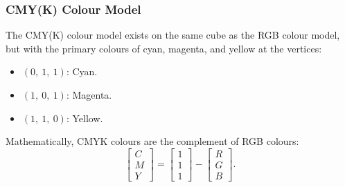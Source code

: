 \documentclass{article}
\begin{document}
\subsubsection{CMY(K) Colour Model}
The CMY(K) colour model exists on the same cube as the RGB colour model,
but with the primary colours of cyan, magenta, and yellow at the
vertices:
\begin{itemize}
    \item \(\left( 0,\: 1,\: 1 \right)\): Cyan.
    \item \(\left( 1,\: 0,\: 1 \right)\): Magenta.
    \item \(\left( 1,\: 1,\: 0 \right)\): Yellow.
\end{itemize}
Mathematically, CMYK colours are the complement of RGB colours:
\begin{equation*}
    \begin{bmatrix}
        C \\
        M \\
        Y
    \end{bmatrix} = \begin{bmatrix}
        1 \\
        1 \\
        1
    \end{bmatrix} - \begin{bmatrix}
        R \\
        G \\
        B
    \end{bmatrix}.
\end{equation*}
\end{document}
